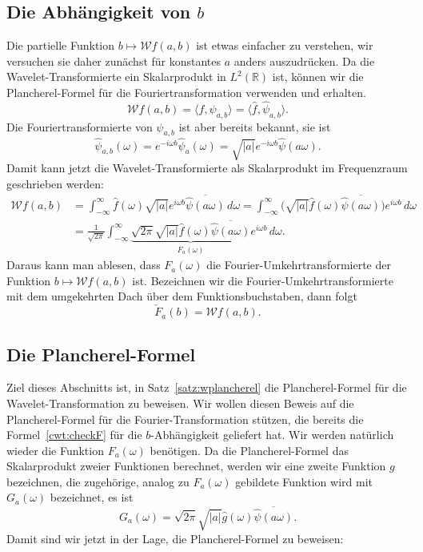 \subsection{Die Abhängigkeit von $b$}
Die partielle Funktion $b\mapsto \mathcal{W}f(a,b)$ ist etwas einfacher
zu verstehen, wir versuchen sie daher zunächst für konstantes $a$
anders auszudrücken.
Da die Wavelet-Transformierte ein Skalarprodukt in $L^2(\mathbb R)$
ist, können wir die Plancherel-Formel für die Fouriertransformation
verwenden und erhalten.
\[
\mathcal{W}f (a,b)
=
\langle f,\psi_{a,b} \rangle
=
\langle \hat{f}, \hat{\psi}_{a,b}\rangle.
\]
Die Fouriertransformierte von $\psi_{a,b}$ ist aber bereits bekannt,
sie ist
\[
\hat{\psi}_{a,b}(\omega)
=
e^{-i\omega b} \hat{\psi}_a(\omega)
=
\sqrt{|a|}e^{-i\omega b} \hat{\psi}(a\omega).
\]
Damit kann jetzt die Wavelet-Transformierte als Skalarprodukt im
Frequenzraum geschrieben werden:
\begin{align*}
\mathcal{W}f (a,b)
&=
\int_{-\infty}^\infty 
\hat{f}(\omega)
\sqrt{|a|}e^{i\omega b} \overline{\hat{\psi}(a\omega)}
\,d\omega
=
\int_{-\infty}^\infty
\bigl(
\sqrt{|a|}
\hat{f}(\omega)
\overline{\hat{\psi}(a\omega)}
\bigr)
e^{i\omega b}
\,d\omega
\\
&=
\frac1{\sqrt{2\pi}}
\int_{-\infty}^\infty
\underbrace{
\sqrt{2\pi}
\sqrt{|a|}
\hat{f}(\omega)
\overline{\hat{\psi}(a\omega)}}_{\displaystyle F_a(\omega)}
e^{i\omega b}
\,d\omega.
\end{align*}
Daraus kann man ablesen, dass $F_a(\omega)$ die Fourier-Umkehrtransformierte
der Funktion $b\mapsto \mathcal{W}f(a,b)$ ist.
Bezeichnen wir die Fourier-Umkehrtransformierte mit dem umgekehrten
Dach über dem Funktionsbuchstaben,
dann folgt
\begin{equation}
\check{F}_a(b) = \mathcal{W}f(a, b).
\label{cwt:checkF}
\end{equation}

\subsection{Die Plancherel-Formel}
Ziel dieses Abschnitts ist, in Satz~\ref{satz:wplancherel} die
Plancherel-Formel für die Wavelet-Transformation zu beweisen.
Wir wollen diesen Beweis auf die Plancherel-Formel für die 
Fourier-Transformation stützen, die bereits die Formel~\eqref{cwt:checkF}
für die $b$-Abhängigkeit geliefert hat.
Wir werden natürlich wieder die Funktion $F_a(\omega)$ benötigen.
Da die Plancherel-Formel das Skalarprodukt zweier Funktionen berechnet,
werden wir eine zweite Funktion $g$ bezeichnen, die zugehörige, analog
zu $F_a(\omega)$ gebildete Funktion wird mit $G_a(\omega)$ bezeichnet,
es ist
\[
G_a(\omega)
=
\sqrt{2\pi}\sqrt{|a|}
\hat{g}(\omega)
\overline{\hat{\psi}(a\omega)}.
\]
Damit sind wir jetzt in der Lage, die Plancherel-Formel zu beweisen:

